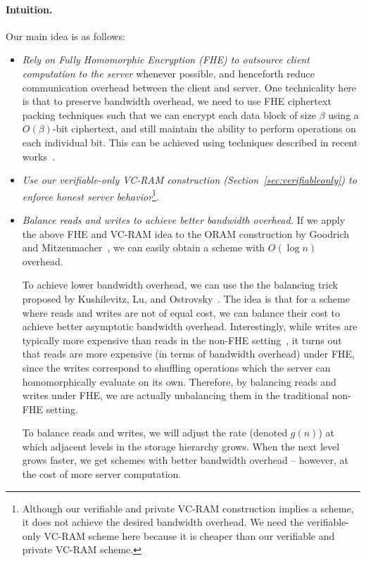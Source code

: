 \paragraph{Intuition.} Our main idea is as follows:
\begin{itemize}
\item
{\it Rely on Fully Homomorphic Encryption (FHE) to outsource
client computation to the server} whenever possible, and henceforth
reduce communication overhead between the client and server.
One technicality here is that to preserve bandwidth overhead, 
we need to use FHE ciphertext packing techniques such
that we can encrypt each data block of size 
$\beta$ using a $O(\beta)$-bit ciphertext, and still
maintain the ability to perform operations on each individual bit.
This can be achieved using techniques described in 
recent works~\cite{BGV12,BGH13}.
\item
{\it Use our verifiable-only VC-RAM construction 
(Section~\ref{sec:verifiableonly}) to enforce honest server
behavior}\footnote{
Although our verifiable and private VC-RAM construction implies
a \nameshort scheme,  it does not achieve the desired bandwidth
overhead. We need the verifiable-only VC-RAM scheme here because
it is cheaper than our verifiable and private VC-RAM scheme.
}.
\item
{\it Balance reads and writes to achieve better bandwidth overhead.}
If we apply the above FHE and VC-RAM idea 
to the ORAM construction by Goodrich and Mitzenmacher~\cite{oram09}, 
we can easily obtain a \nameshort scheme with 
$O(\log n)$ overhead. 

To achieve lower bandwidth overhead, we can use the 
the balancing trick 
proposed by Kushilevitz, Lu, and Ostrovsky~\cite{oram03}.
The idea is that for a scheme where reads and   
writes are not of equal cost, 
we can balance their cost to 
achieve better asymptotic bandwidth overhead.
Interestingly, while writes are typically more expensive than reads
in the non-FHE setting~\cite{oram09},  
it turns out that reads are 
more expensive (in terms of bandwidth overhead) 
under FHE, since the writes correspond
to shuffling operations which the server can homomorphically
evaluate on its own.
Therefore, by balancing reads and writes under FHE, we
are actually unbalancing them in the traditional non-FHE setting.

To balance reads and writes, we will adjust the rate (denoted $g(n)$)
at which adjacent levels in the storage hierarchy 
grows. When the next level grows faster, we get schemes with better
bandwidth overhead -- however, at the cost of more server computation.
\end{itemize}



